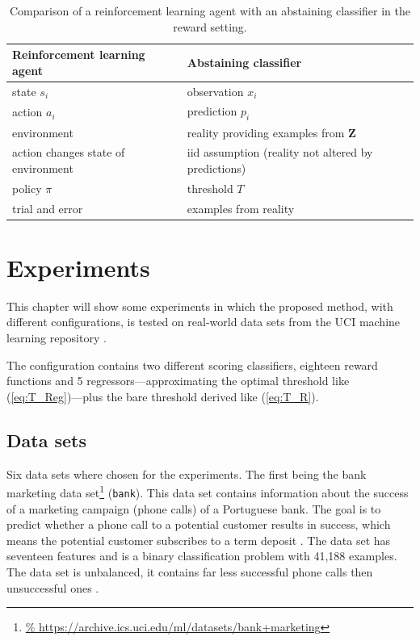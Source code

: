 \documentclass[twoside,11pt]{article}
\def\Z{\textbf{Z}}
\begin{document}
\begin{table}
  \begin{center}
  \begin{tabu}{l|l}
    Reinforcement learning agent &Abstaining classifier \\
    \hline
    state $s_i$ &observation $x_i$ \\
    action $a_i$ &prediction $p_i$ \\
    environment &reality providing examples from $\Z$ \\
    action changes state of environment
    &iid assumption (reality not altered by predictions)\\
    policy $\pi$ &threshold $T$ \\
    trial and error &examples from reality
  \end{tabu}
  \end{center}
  \caption{Comparison of a reinforcement learning agent
            with an abstaining classifier in the reward
            setting.}
  \label{tab:rl_vs_ac}
\end{table}


\section{Experiments}
\label{sec:experiments}

This chapter will show some experiments in which the
proposed method, with different configurations, is tested
on real-world data sets from the UCI machine learning
repository \citep[see][]{uci}.

The configuration contains two different scoring
classifiers, eighteen reward functions and 5
regressors---approximating the optimal threshold like
(\ref{eq:T_Reg})---plus the bare threshold derived like
(\ref{eq:T_R}).

\subsection{Data sets}

Six data sets where chosen for the experiments. The first
being the bank marketing data set\footnote{\url{%
  https://archive.ics.uci.edu/ml/datasets/bank+marketing}}
(\texttt{bank}).
This data set contains information about the success of
a marketing campaign (phone calls) of a Portuguese bank.
The goal is to predict whether a phone call to a potential
customer results in success, which means the potential
customer subscribes to a term deposit
\citep[see][]{moro_et_al_2014}.
The data set has seventeen features and is a binary
classification problem with 41,188 examples.
The data set is unbalanced, it contains far less successful
phone calls then unsuccessful ones
\citep[see][]{moro_et_al_2014}.
\end{document}
